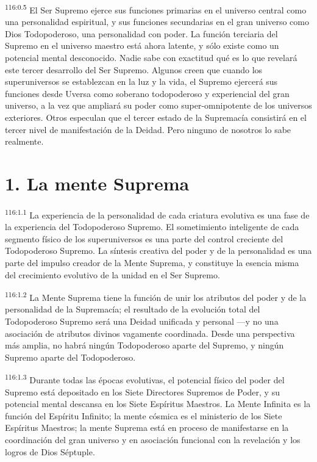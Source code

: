 \par
\textsuperscript{116:0.5} El Ser Supremo ejerce sus funciones primarias en el universo central como una personalidad espiritual, y sus funciones secundarias en el gran universo como Dios Todopoderoso, una personalidad con poder. La función terciaria del Supremo en el universo maestro está ahora latente, y sólo existe como un potencial mental desconocido. Nadie sabe con exactitud qué es lo que revelará este tercer desarrollo del Ser Supremo. Algunos creen que cuando los superuniversos se establezcan en la luz y la vida, el Supremo ejercerá sus funciones desde Uversa como soberano todopoderoso y experiencial del gran universo, a la vez que ampliará su poder como super-omnipotente de los universos exteriores. Otros especulan que el tercer estado de la Supremacía consistirá en el tercer nivel de manifestación de la Deidad. Pero ninguno de nosotros lo sabe realmente.

\section*{1. La mente Suprema}
\par
\textsuperscript{116:1.1} La experiencia de la personalidad de cada criatura evolutiva es una fase de la experiencia del Todopoderoso Supremo. El sometimiento inteligente de cada segmento físico de los superuniversos es una parte del control creciente del Todopoderoso Supremo. La síntesis creativa del poder y de la personalidad es una parte del impulso creador de la Mente Suprema, y constituye la esencia misma del crecimiento evolutivo de la unidad en el Ser Supremo.

\par
\textsuperscript{116:1.2} La Mente Suprema tiene la función de unir los atributos del poder y de la personalidad de la Supremacía; el resultado de la evolución total del Todopoderoso Supremo será una Deidad unificada y personal ---y no una asociación de atributos divinos vagamente coordinada. Desde una perspectiva más amplia, no habrá ningún Todopoderoso aparte del Supremo, y ningún Supremo aparte del Todopoderoso.

\par
\textsuperscript{116:1.3} Durante todas las épocas evolutivas, el potencial físico del poder del Supremo está depositado en los Siete Directores Supremos de Poder, y su potencial mental descansa en los Siete Espíritus Maestros. La Mente Infinita es la función del Espíritu Infinito; la mente cósmica es el ministerio de los Siete Espíritus Maestros; la mente Suprema está en proceso de manifestarse en la coordinación del gran universo y en asociación funcional con la revelación y los logros de Dios Séptuple.

